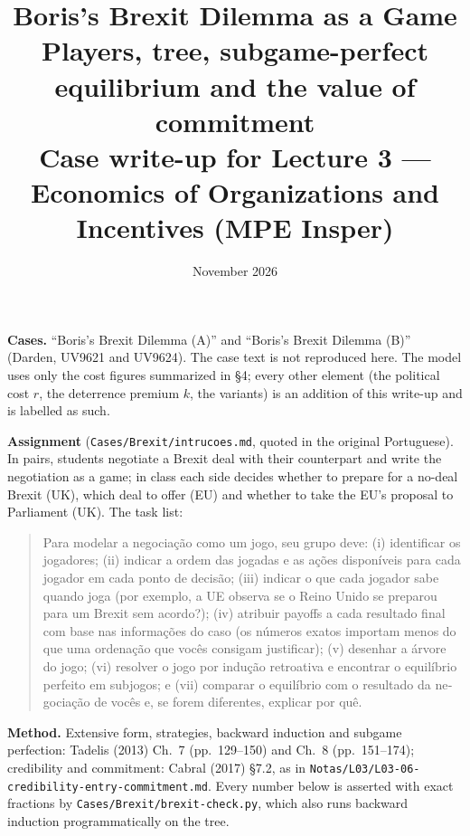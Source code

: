 \documentclass[11pt,a4paper]{article}
\title{\textbf{Boris's Brexit Dilemma as a Game}\\[4pt]
  \large Players, tree, subgame-perfect equilibrium and the value of commitment\\[2pt]
  \normalsize Case write-up for Lecture 3 --- Economics of Organizations and Incentives (MPE Insper)}
\date{November 2026}
\begin{document}
\maketitle
\thispagestyle{empty}

\begin{tcolorbox}[colback=src!4,colframe=src,boxrule=0.5pt,title={The assignment and the sources}]
\textbf{Cases.} ``Boris's Brexit Dilemma (A)'' and ``Boris's Brexit Dilemma (B)'' (Darden,
UV9621 and UV9624). The case text is not reproduced here. The model uses only the cost figures
summarized in \S4; every other element (the political cost $r$, the deterrence premium $k$, the
variants) is an addition of this write-up and is labelled as such.

\textbf{Assignment} (\texttt{Cases/Brexit/intrucoes.md}, quoted in the original Portuguese). In
pairs, students negotiate a Brexit deal with their counterpart and write the negotiation as a
game; in class each side decides whether to prepare for a no-deal Brexit (UK), which deal to offer
(EU) and whether to take the EU's proposal to Parliament (UK). The task list:

\begin{quote}\small\foreignlanguage{portuguese}{%
Para modelar a negociação como um jogo, seu grupo deve:
(i) identificar os jogadores;
(ii) indicar a ordem das jogadas e as ações disponíveis para cada jogador em cada ponto de
decisão;
(iii) indicar o que cada jogador sabe quando joga (por exemplo, a UE observa se o Reino Unido se
preparou para um Brexit sem acordo?);
(iv) atribuir payoffs a cada resultado final com base nas informações do caso (os números exatos
importam menos do que uma ordenação que vocês consigam justificar);
(v) desenhar a árvore do jogo; (vi) resolver o jogo por indução retroativa e encontrar o
equilíbrio perfeito em subjogos; e
(vii) comparar o equilíbrio com o resultado da negociação de vocês e, se forem diferentes,
explicar por quê.}
\end{quote}

\textbf{Method.} Extensive form, strategies, backward induction and subgame perfection: Tadelis
(2013) Ch.~7 (pp.~129--150) and Ch.~8 (pp.~151--174); credibility and commitment: Cabral (2017)
\S7.2, as in \texttt{Notas/L03/L03-06-credibility-entry-commitment.md}. Every number below is
asserted with exact fractions by \texttt{Cases/Brexit/brexit-check.py}, which also runs backward
induction programmatically on the tree.
\end{tcolorbox}
\end{document}
